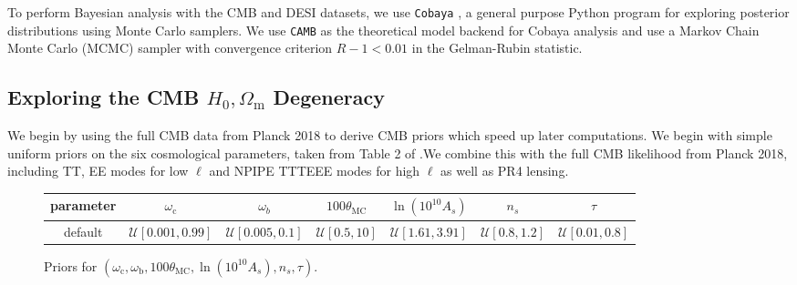 \documentclass{lkx_paper}
\renewcommand{\c}{{\mathrm{c}}}
\newcommand{\m}{{\mathrm{m}}}
\newcommand{\MC}{{\mathrm{MC}}}
\newcommand{\UU}{{\mathcal{U}}}
\begin{document}
To perform Bayesian analysis with the CMB and DESI datasets, we use \texttt{Cobaya} \cite{Torrado_2021}, a general purpose Python program for exploring posterior distributions using Monte Carlo samplers. We use \texttt{CAMB} \cite{Lewis:1999bs} as the theoretical model backend for Cobaya analysis and use a Markov Chain Monte Carlo (MCMC) sampler with convergence criterion $R-1<0.01$ in the Gelman-Rubin statistic.

\subsection*{Exploring the CMB $H_0,\Omega_\m$ Degeneracy}

We begin by using the full CMB data from Planck 2018 to derive CMB priors which speed up later computations. We begin with simple uniform priors on the six cosmological parameters, taken from Table 2 of \cite{desicollaboration2024desi2024viicosmological}.We combine this with the full CMB likelihood from Planck 2018, including TT, EE modes for low $\ell$ and NPIPE TTTEEE modes for high $\ell$ as well as PR4 lensing.

\begin{figure}[ht]
  \renewcommand{\arraystretch}{1.2}
  \centering
  \begin{tabular}{|c|c|c|c|c|c|c|}
    \hline
    parameter & $\omega_\c$ & $\omega_b$ & $100\theta_\MC$ & $\ln(10^{10} A_s)$ & $n_s$ & $\tau$\\
    \hline
    default & $\UU[0.001, 0.99]$ & $\UU[0.005, 0.1]$ &$\UU[0.5,10]$ &$\UU[1.61,3.91]$ &$\UU[0.8,1.2]$ & $\UU[0.01, 0.8]$  \\
    \hline
  \end{tabular}
  \medskip
  \caption{Priors for $(\omega_\mathrm{c}, \omega_\mathrm{b}, 100\theta_{\mathrm{MC}}, \ln(10^{10}A_s), n_s, \tau)$.}
\end{figure}
\end{document}
